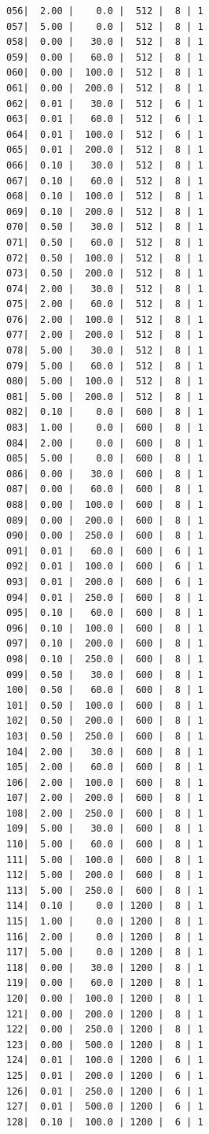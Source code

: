 \documentclass[letterpaper, oneside, 12pt]{article}
\begin{document}
\begin{verbatim}
056|  2.00 |    0.0 |  512 |  8 | 1
057|  5.00 |    0.0 |  512 |  8 | 1
058|  0.00 |   30.0 |  512 |  8 | 1
059|  0.00 |   60.0 |  512 |  8 | 1
060|  0.00 |  100.0 |  512 |  8 | 1
061|  0.00 |  200.0 |  512 |  8 | 1
062|  0.01 |   30.0 |  512 |  6 | 1
063|  0.01 |   60.0 |  512 |  6 | 1
064|  0.01 |  100.0 |  512 |  6 | 1
065|  0.01 |  200.0 |  512 |  8 | 1
066|  0.10 |   30.0 |  512 |  8 | 1
067|  0.10 |   60.0 |  512 |  8 | 1
068|  0.10 |  100.0 |  512 |  8 | 1
069|  0.10 |  200.0 |  512 |  8 | 1
070|  0.50 |   30.0 |  512 |  8 | 1
071|  0.50 |   60.0 |  512 |  8 | 1
072|  0.50 |  100.0 |  512 |  8 | 1
073|  0.50 |  200.0 |  512 |  8 | 1
074|  2.00 |   30.0 |  512 |  8 | 1
075|  2.00 |   60.0 |  512 |  8 | 1
076|  2.00 |  100.0 |  512 |  8 | 1
077|  2.00 |  200.0 |  512 |  8 | 1
078|  5.00 |   30.0 |  512 |  8 | 1
079|  5.00 |   60.0 |  512 |  8 | 1
080|  5.00 |  100.0 |  512 |  8 | 1
081|  5.00 |  200.0 |  512 |  8 | 1
082|  0.10 |    0.0 |  600 |  8 | 1
083|  1.00 |    0.0 |  600 |  8 | 1
084|  2.00 |    0.0 |  600 |  8 | 1
085|  5.00 |    0.0 |  600 |  8 | 1
086|  0.00 |   30.0 |  600 |  8 | 1
087|  0.00 |   60.0 |  600 |  8 | 1
088|  0.00 |  100.0 |  600 |  8 | 1
089|  0.00 |  200.0 |  600 |  8 | 1
090|  0.00 |  250.0 |  600 |  8 | 1
091|  0.01 |   60.0 |  600 |  6 | 1
092|  0.01 |  100.0 |  600 |  6 | 1
093|  0.01 |  200.0 |  600 |  6 | 1
094|  0.01 |  250.0 |  600 |  8 | 1
095|  0.10 |   60.0 |  600 |  8 | 1
096|  0.10 |  100.0 |  600 |  8 | 1
097|  0.10 |  200.0 |  600 |  8 | 1
098|  0.10 |  250.0 |  600 |  8 | 1
099|  0.50 |   30.0 |  600 |  8 | 1
100|  0.50 |   60.0 |  600 |  8 | 1
101|  0.50 |  100.0 |  600 |  8 | 1
102|  0.50 |  200.0 |  600 |  8 | 1
103|  0.50 |  250.0 |  600 |  8 | 1
104|  2.00 |   30.0 |  600 |  8 | 1
105|  2.00 |   60.0 |  600 |  8 | 1
106|  2.00 |  100.0 |  600 |  8 | 1
107|  2.00 |  200.0 |  600 |  8 | 1
108|  2.00 |  250.0 |  600 |  8 | 1
109|  5.00 |   30.0 |  600 |  8 | 1
110|  5.00 |   60.0 |  600 |  8 | 1
111|  5.00 |  100.0 |  600 |  8 | 1
112|  5.00 |  200.0 |  600 |  8 | 1
113|  5.00 |  250.0 |  600 |  8 | 1
114|  0.10 |    0.0 | 1200 |  8 | 1
115|  1.00 |    0.0 | 1200 |  8 | 1
116|  2.00 |    0.0 | 1200 |  8 | 1
117|  5.00 |    0.0 | 1200 |  8 | 1
118|  0.00 |   30.0 | 1200 |  8 | 1
119|  0.00 |   60.0 | 1200 |  8 | 1
120|  0.00 |  100.0 | 1200 |  8 | 1
121|  0.00 |  200.0 | 1200 |  8 | 1
122|  0.00 |  250.0 | 1200 |  8 | 1
123|  0.00 |  500.0 | 1200 |  8 | 1
124|  0.01 |  100.0 | 1200 |  6 | 1
125|  0.01 |  200.0 | 1200 |  6 | 1
126|  0.01 |  250.0 | 1200 |  6 | 1
127|  0.01 |  500.0 | 1200 |  6 | 1
128|  0.10 |  100.0 | 1200 |  6 | 1

\end{verbatim}
\end{document}
